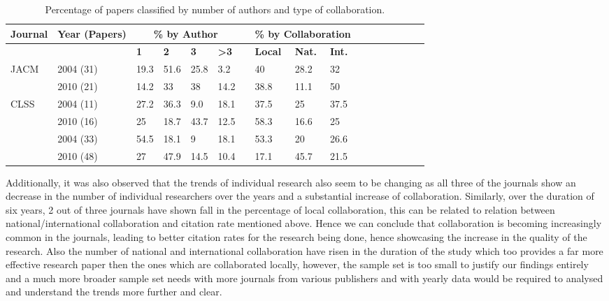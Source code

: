\documentclass[12pt]{article}
\begin{document}
\begin{table}[htdp]
\begin{tabular*}{\linewidth}{@{\extracolsep{\fill}}lllllllllllllllll@{}}

  \toprule
  \midrule
  \textbf{Journal} & \textbf{Year (Papers)} &\multicolumn{4}{c}{\textbf{\% by Author}} & & \multicolumn{3}{c}{\textbf{\% by Collaboration}} \\
  \midrule \addlinespace
  && \textbf{1} & \textbf{2} & \textbf{3} & \textbf{\textgreater 3} & & \textbf{Local} & \textbf{Nat.} & \textbf{Int.} & \\
    \midrule
  \multirow{2}{*}{JACM} & 2004 (31) & 19.3 & 51.6 & 25.8 & 3.2 && 40 &  28.2 & 32 \\
  & 2010 (21) & 14.2 & 33 & 38 & 14.2 && 38.8 & 11.1 & 50\\
  \midrule
  \multirow{3}{*}{CLSS} & 2004 (11) & 27.2 & 36.3 & 9.0 & 18.1 && 37.5 & 25 & 37.5 \\
  & 2010 (16) & 25 & 18.7 & 43.7 & 12.5 && 58.3 & 16.6 & 25\\
  \midrule
  \multirow{3}{*}{JLC} & 2004 (33) & 54.5 & 18.1 & 9 & 18.1 && 53.3 &  20 & 26.6 \\
  & 2010 (48) & 27 & 47.9 & 14.5 & 10.4 && 17.1 & 45.7 & 21.5\\
  \bottomrule

\end{tabular*}
\caption{Percentage of papers classified by number of authors and type of collaboration.}
\label{percentage comparison}
\end{table}

Additionally, it was also observed that the trends of individual research also seem to be changing as all three of the journals show an decrease in the number of individual researchers over the years and a substantial increase of collaboration. Similarly, over the duration of six years, 2 out of three journals have shown fall in the percentage of local collaboration, this can be related to relation between national/international collaboration and citation rate mentioned above. Hence we can conclude that collaboration is becoming increasingly common in the journals, leading to better citation rates for the research being done, hence showcasing the increase in the quality of the research. Also the number of national and international collaboration have risen in the duration of the study which too provides a far more effective research paper then the ones which are collaborated locally, however, the sample set is too small to justify our findings entirely and a much more broader sample set needs with more journals from various publishers and with yearly data would be required to analysed and understand the trends more further and clear.





\end{document}
